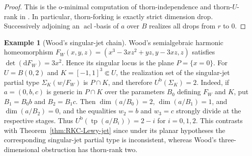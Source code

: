 \documentclass{amsart}
\theoremstyle{definition}
\newtheorem{example}{Example}[section]
\theoremstyle{remark}
\numberwithin{equation}{section}
\begin{document}
\begin{proof}
This is the o-minimal computation of thorn-independence and thorn-$U$-rank
in \cite[\S5.2]{Onshuus2006Thorn}. In particular, thorn-forking is exactly
strict dimension drop. Successively adjoining an $\operatorname{acl}$-basis
of $a$ over $B$ realizes all drops from $r$ to $0$.
\end{proof}

\begin{example}[Wood's singular-jet chain]
\label{ex:Wood-ominimal-singular-jet}
Wood's semialgebraic harmonic homeomorphism $F_W(x,y,z)=(x^3-3xz^2+yz,y-3xz,z)$
\cite[p.~166]{Wood1991LewyFails} satisfies $\det(\mathrm{d}F_W)=3x^2$.
Hence its singular locus is the plane $P=\{x=0\}$. For $U=B(0,2)$ and $K=[-1,1]^3\Subset U$, the realization set of the
singular-jet partial type $\Sigma_K(w/F_W)$ is $P\cap K$, and therefore $U^{\mathrm b}(\Sigma_K)=2$.
Indeed, if $a=(0,b,c)$ is generic in $P\cap K$ over the parameters $B_0$
defining $F_W$ and $K$, put $B_1=B_0b$ and $B_2=B_1c$. Then
$\dim(a/B_0)=2$, $\dim(a/B_1)=1$, and $\dim(a/B_2)=0$,
and the equalities $w_2=b$ and $w_3=c$ strongly divide at the respective
stages. Thus $U^{\mathrm b}(\operatorname{tp}(a/B_i))=2-i$ for $i=0,1,2$.
This contrasts with Theorem~\ref{thm:RKC-Lewy-jet} since under its planar hypotheses the corresponding singular-jet partial type is inconsistent,
whereas Wood's three-dimensional obstruction has thorn-rank two.
\end{example}
\end{document}
